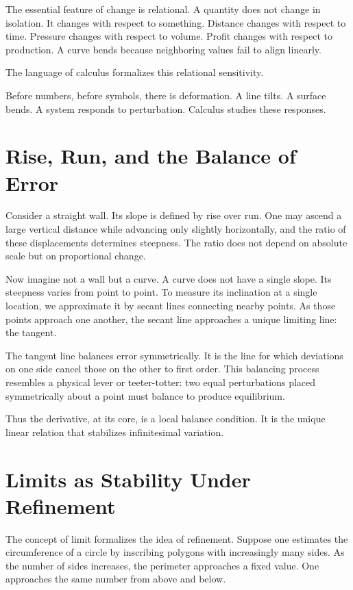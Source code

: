 \documentclass[12pt]{book}
\begin{document}
The essential feature of change is relational. A quantity does not change in isolation. It changes with respect to something. Distance changes with respect to time. Pressure changes with respect to volume. Profit changes with respect to production. A curve bends because neighboring values fail to align linearly. 

The language of calculus formalizes this relational sensitivity.

Before numbers, before symbols, there is deformation. A line tilts. A surface bends. A system responds to perturbation. Calculus studies these responses.

\section{Rise, Run, and the Balance of Error}

Consider a straight wall. Its slope is defined by rise over run. One may ascend a large vertical distance while advancing only slightly horizontally, and the ratio of these displacements determines steepness. The ratio does not depend on absolute scale but on proportional change.

Now imagine not a wall but a curve. A curve does not have a single slope. Its steepness varies from point to point. To measure its inclination at a single location, we approximate it by secant lines connecting nearby points. As those points approach one another, the secant line approaches a unique limiting line: the tangent.

The tangent line balances error symmetrically. It is the line for which deviations on one side cancel those on the other to first order. This balancing process resembles a physical lever or teeter-totter: two equal perturbations placed symmetrically about a point must balance to produce equilibrium. 

Thus the derivative, at its core, is a local balance condition. It is the unique linear relation that stabilizes infinitesimal variation.

\section{Limits as Stability Under Refinement}

The concept of limit formalizes the idea of refinement. Suppose one estimates the circumference of a circle by inscribing polygons with increasingly many sides. As the number of sides increases, the perimeter approaches a fixed value. One approaches the same number from above and below. 
\end{document}
